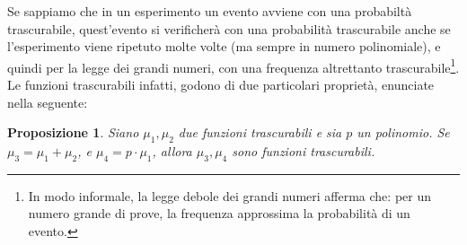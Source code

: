 \documentclass[a4paper,openright,twoside,12pt]{report}
\newtheorem{proposizione}{Proposizione}[chapter]
\begin{document}
Se sappiamo che in un esperimento un evento avviene con una probabilt\`a trascurabile,
quest'evento si verificher\`a con una probabilit\`a trascurabile anche se l'esperimento viene ripetuto molte volte (ma sempre in numero polinomiale), e quindi per la legge dei grandi numeri, 
con una frequenza altrettanto trascurabile\footnote{In modo informale, la legge debole dei grandi numeri afferma che: per un numero grande di prove, 
la frequenza approssima la probabilit\`a di un evento.}. 
Le funzioni trascurabili infatti, godono di due particolari propriet\`a, enunciate nella seguente:
\begin{proposizione}
Siano $\mu_1, \mu_2$ due funzioni trascurabili e sia $p$ un polinomio. Se $\mu_3 = \mu_1 + \mu_2$, e $\mu_4= p\cdot \mu_1$, allora $\mu_3, \mu_4$ sono funzioni trascurabili.  
\end{proposizione} 
\end{document}
